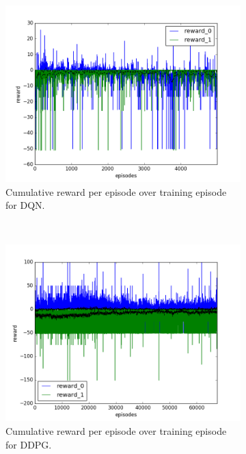 \begin{figure}[h]
  \begin{subfigure}[h]{\figscale\linewidth}
    \includegraphics[trim=10 10 10 10,clip,width=\linewidth]
    {../results/dqn_1vs1/reward.png}
    \caption{Cumulative reward per episode over training episode for DQN.}
    \label{fig:dqn-1vs1-reward}
  \end{subfigure}
  ~
  \begin{subfigure}[h]{\figscale\linewidth}
    \includegraphics[trim=10 10 10 10,clip,width=\linewidth]
    {../results/ddpg_1vs1/reward.png}
    \caption{Cumulative reward per episode over training episode for DDPG.}
    \label{fig:ddpg-1vs1-reward}
  \end{subfigure}
  ~
  \begin{subfigure}[h]{\figscale\linewidth}

\end{subfigure}
\end{figure}
